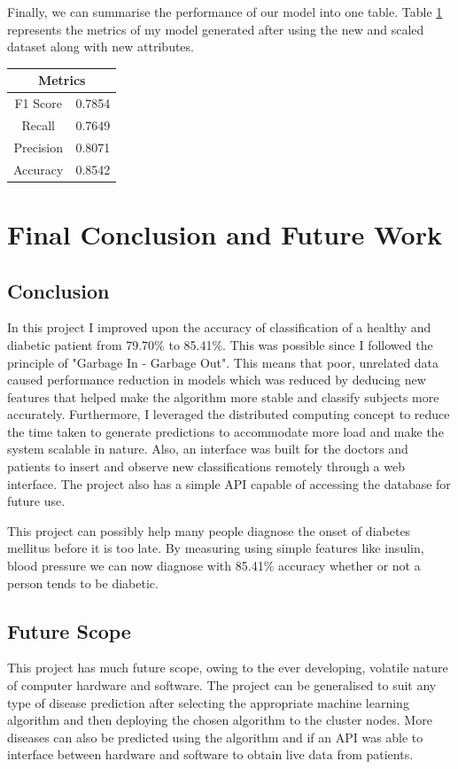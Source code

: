 \documentclass[12pt]{article}
\begin{document}
Finally, we can summarise the performance of our model into one table. Table \ref{table:15} represents the metrics of my model generated after using the new and scaled dataset along with new attributes.

\begin{table}[ht]
\centering
\begin{tabular}{|c|c|}
\hline
\multicolumn{2}{|c|}{Metrics} \\ \hline
F1 Score        & 0.7854      \\ \hline
Recall          & 0.7649      \\ \hline
Precision       & 0.8071      \\ \hline
Accuracy        & 0.8542      \\ \hline
\end{tabular}
\label{table:15}
\end{table}


\clearpage
\newpage
\section{Final Conclusion and Future Work}
\subsection{Conclusion}
In this project I improved upon the accuracy of classification of a healthy and diabetic patient from 79.70\% to 85.41\%. This was possible since I followed the principle of "Garbage In - Garbage Out". This means that poor, unrelated data caused performance reduction in models which was reduced by deducing new features that helped make the algorithm more stable and classify subjects more accurately. Furthermore, I leveraged the distributed computing concept to reduce the time taken to generate predictions to accommodate more load and make the system scalable in nature. Also, an interface was built for the doctors and patients to insert and observe new classifications remotely through a web interface. The project also has a simple API capable of accessing the database for future use.

This project can possibly help many people diagnose the onset of diabetes mellitus before it is too late. By measuring using simple features like insulin, blood pressure we can now diagnose with 85.41\% accuracy whether or not a person tends to be diabetic.

\subsection{Future Scope}
This project has much future scope, owing to the ever developing, volatile nature of computer hardware and software. The project can be generalised to suit any type of disease prediction after selecting the appropriate machine learning algorithm and then deploying the chosen algorithm to the cluster nodes. More diseases can also be predicted using the algorithm and if an API was able to interface between hardware and software to obtain live data from patients.
\end{document}
